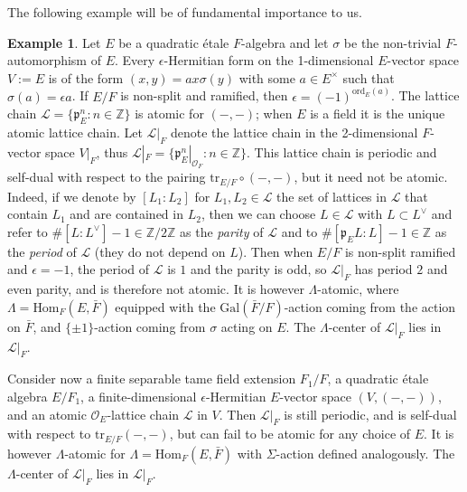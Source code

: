 \documentclass{article}
\def\mf#1{\mathfrak{#1}}
\def\mc#1{\mathcal{#1}}
\def\tx#1{\textrm{#1}}
\def\Z{\mathbb{Z}}
\def\cO{\mathcal{O}}
\theoremstyle{definition}
\newtheorem{exa}[thm]{Example}
\numberwithin{equation}{subsection}
\renewcommand{\-}{\hyp{}}
\begin{document}
The following example will be of fundamental importance to us. 
\begin{exa} \label{exa:lambda_atomic}
Let $E$ be a quadratic \'etale $F$-algebra and let $\sigma$ be the non-trivial $F$-automorphism of $E$. Every $\epsilon$-Hermitian form on the 1-dimensional $E$-vector space $V:=E$ is of the form $(x,y)=ax\sigma(y)$ with some $a \in E^\times$ such that $\sigma(a)=\epsilon a$. If $E/F$ is non-split and ramified, then $\epsilon=(-1)^{\tx{ord}_E(a)}$. The lattice chain $\mc{L}=\{\mf{p}_E^n: n \in \Z\}$ is atomic for $(-,-)$; when $E$ is a field it is the unique atomic lattice chain. Let $\mc{L}|_F$ denote the lattice chain in the 2-dimensional $F$-vector space $V|_F$, thus $\mc{L}|_F=\{\mf{p}^n_E|_{\cO_F} : n \in \Z\}$. This lattice chain is periodic and self-dual with respect to the pairing $\tx{tr}_{E/F}\circ (-,-)$, but it need not be atomic. Indeed, if we denote by $[L_1:L_2]$ for $L_1,L_2 \in \mc{L}$ the set of lattices in $\mc{L}$ that contain $L_1$ and are contained in $L_2$, then we can choose $L \in \mc{L}$ with $L \subset L^\vee$ and refer to $\#[L:L^\vee]-1 \in \Z/2\Z$ as the \emph{parity} of $\mc{L}$ and to $\#[\mf{p}_E L:L]-1 \in \Z$ as the \emph{period} of $\mc{L}$ (they do not depend on $L$). Then when $E/F$ is non-split ramified and $\epsilon=-1$, the period of $\mc{L}$ is $1$ and the parity is odd,
so $\mc{L}|_F$ has period $2$ and even parity, and is therefore not atomic. It is however $\Lambda$-atomic, where $\Lambda=\tx{Hom}_F(E,\bar F)$ equipped with the $\tx{Gal}(\bar F/F)$-action coming from the action on $\bar F$, and $\{\pm1\}$-action coming from $\sigma$ acting on $E$. The $\Lambda$-center of $\mc{L}|_F$ lies in $\mc{L}|_F$.

Consider now a finite separable tame field extension $F_1/F$, a quadratic \'etale algebra $E/F_1$, a finite-dimensional $\epsilon$-Hermitian $E$-vector space $(V,(-,-))$, and an atomic $\cO_E$-lattice chain $\mc{L}$ in $V$. Then $\mc{L}|_F$ is still periodic, and is self-dual with respect to $\tx{tr}_{E/F}(-,-)$, but can fail to be atomic for any choice of $E$. It is however $\Lambda$-atomic for $\Lambda=\tx{Hom}_F(E,\bar F)$ with $\Sigma$-action defined analogously. The $\Lambda$-center of $\mc{L}|_F$ lies in $\mc{L}|_F$.


\end{exa}
\end{document}
